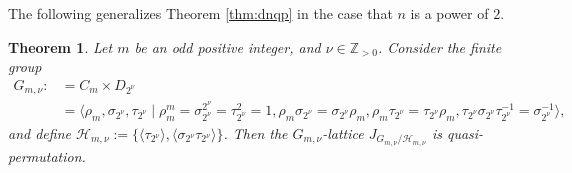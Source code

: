 \documentclass[10pt,a4paper]{amsart}
\newtheorem{thm}{Theorem}
\newcommand{\Zpn}{\mathbb{Z}_{>0}}
\newcommand{\cH}{\mathcal{H}}
\begin{document}
The following generalizes Theorem \ref{thm:dnqp} in the case that $n$ is a power of $2$.

\begin{thm}\label{thm:nlqp}
Let $m$ be an odd positive integer, and $\nu \in \Zpn$. Consider the finite group
\begin{align*}
G_{m,\nu}:&=C_{m}\times D_{2^{\nu}}\\
&=\langle \rho_{m},\sigma_{2^{\nu}},\tau_{2^{\nu}} \mid \rho_{m}^{m}=\sigma_{2^{\nu}}^{2^{\nu}}=\tau_{2^{\nu}}^{2}=1,\rho_{m}\sigma_{2^{\nu}}=\sigma_{2^{\nu}}\rho_{m},\rho_{m}\tau_{2^{\nu}}=\tau_{2^{\nu}}\rho_{m},\tau_{2^{\nu}}\sigma_{2^{\nu}}\tau_{2^{\nu}}^{-1}=\sigma_{2^{\nu}}^{-1} \rangle, 
\end{align*}
and define $\cH_{m,\nu}:=\{\langle \tau_{2^{\nu}} \rangle,\langle \sigma_{2^{\nu}}\tau_{2^{\nu}} \rangle \}$. Then the $G_{m,\nu}$-lattice $J_{G_{m,\nu}/\cH_{m,\nu}}$ is quasi-permutation. 
\end{thm}
\end{document}
